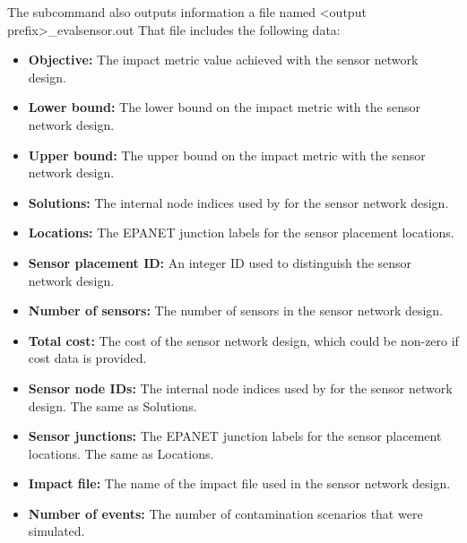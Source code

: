 The  subcommand also outputs information a file named <output prefix>\_evalsensor.out 
That file includes the following data:
\begin{itemize}
\item {\bfseries Objective:} The impact metric value achieved with the sensor network design.
\item {\bfseries Lower bound:} The lower bound on the impact metric with the sensor network design.
\item {\bfseries Upper bound:} The upper bound on the impact metric with the sensor network design.
\item {\bfseries Solutions:} The internal node indices used by  for the sensor network design.
\item {\bfseries Locations:} The EPANET junction labels for the sensor placement locations.
\item {\bfseries Sensor placement ID:} An integer ID used to distinguish the sensor network design.
\item {\bfseries Number of sensors:} The number of sensors in the sensor network design.
\item {\bfseries Total cost:} The cost of the sensor network design, which could be non-zero if cost data is provided.
\item {\bfseries Sensor node IDs:} The internal node indices used by  for the sensor network design. The same as Solutions.
\item {\bfseries Sensor junctions:} The EPANET junction labels for the sensor placement locations. The same as Locations.
\item {\bfseries Impact file:} The name of the impact file used in the sensor network design.
\item {\bfseries Number of events:} The number of contamination scenarios that were simulated.
\end{itemize}

